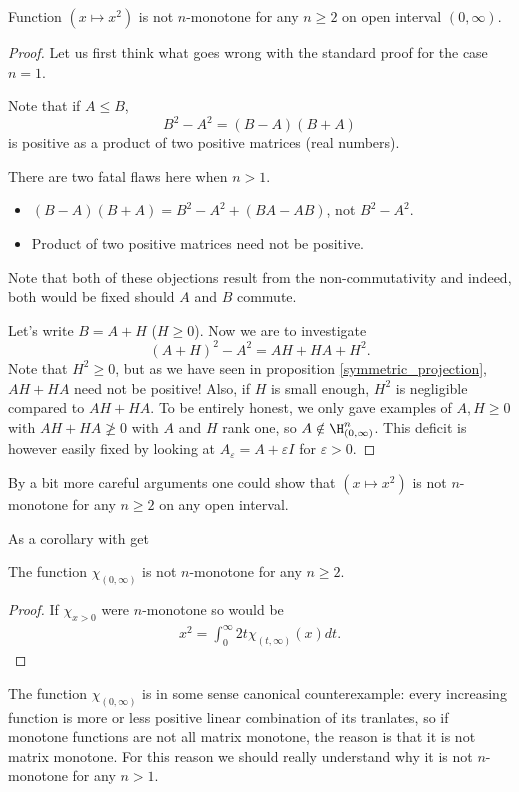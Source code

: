 \begin{prop}
	Function $(x \mapsto x^2)$ is not $n$-monotone for any $n \geq 2$ on open interval $(0, \infty)$.
\end{prop}
\begin{proof}
	Let us first think what goes wrong with the standard proof for the case $n = 1$.

	Note that if $A \leq B$,
	\[
		B^2 - A^2 = (B - A) (B + A)
	\]
	is positive as a product of two positive matrices (real numbers).

	There are two fatal flaws here when $n > 1$.
	\begin{itemize}
		\item $(B - A) (B + A) = B^2-A^2 + (B A - A B)$, not $B^2 - A^2$.
		\item Product of two positive matrices need not be positive.
	\end{itemize}
	Note that both of these objections result from the non-commutativity and indeed, both would be fixed should $A$ and $B$ commute.

	Let's write $B = A + H$ ($H \geq 0$). Now we are to investigate
	\[
		(A + H)^2-A^2 = A H + H A + H^2.
	\]
	Note that $H^2 \geq 0$, but as we have seen in proposition \ref{symmetric_projection}, $A H + H A$ need not be positive! Also, if $H$ is small enough, $H^2$ is negligible compared to $AH + HA$. To be entirely honest, we only gave examples of $A, H \geq 0$ with $A H + H A \not\geq 0$ with $A$ and $H$ rank one, so $A \notin \H^{n}_{(0, \infty)}$. This deficit is however easily fixed by looking at $A_{\varepsilon} = A + \varepsilon I$ for $\varepsilon > 0$.
\end{proof}

By a bit more careful arguments one could show that $(x \mapsto x^2)$ is not $n$-monotone for any $n \geq 2$ on any open interval.

As a corollary with get

\begin{kor}\label{chimon}
	The function $\chi_{(0, \infty)}$ is not $n$-monotone for any $n \geq 2$.
\end{kor}

\begin{proof}
	If $\chi_{x > 0}$ were $n$-monotone so would be
	\begin{align*}
		x^2 = \int_{0}^{\infty} 2 t \chi_{(t, \infty)}(x) dt.
	\end{align*}
\end{proof}

The function $\chi_{(0, \infty)}$ is in some sense canonical counterexample: every increasing function is more or less positive linear combination of its tranlates, so if monotone functions are not all matrix monotone, the reason is that it is not matrix monotone. For this reason we should really understand why it is not $n$-monotone for any $n > 1$.

